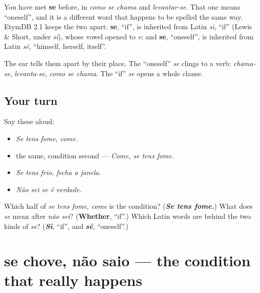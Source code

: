 \begin{cousinweb}
You have met \textbf{se} before, in \emph{como se chama} and \emph{levantar-se}. That one means \textquotedblleft{}oneself\textquotedblright{}, and it is a different word that happens to be spelled the same way. EtymDB 2.1 keeps the two apart: \textbf{se}, \textquotedblleft{}if\textquotedblright{}, is inherited from Latin \emph{sī}, \textquotedblleft{}if\textquotedblright{} (Lewis \& Short, under \emph{si}), whose vowel opened to \emph{e}; and \textbf{se}, \textquotedblleft{}oneself\textquotedblright{}, is inherited from Latin \emph{sē}, \textquotedblleft{}himself, herself, itself\textquotedblright{}.

The ear tells them apart by their place. The \textquotedblleft{}oneself\textquotedblright{} \emph{se} clings to a verb: \emph{chama-se}, \emph{levanta-se}, \emph{como se chama}. The \textquotedblleft{}if\textquotedblright{} \emph{se} opens a whole clause.
\end{cousinweb}

\subsection*{Your turn}
Say these aloud:

\begin{itemize}
\raggedright
  \item \emph{Se tens fome, come.}
  \item the same, condition second — \emph{Come, se tens fome.}
  \item \emph{Se tens frio, fecha a janela.}
  \item \emph{Não sei se é verdade.}
\end{itemize}

\begin{tcolorbox}[breakable,colback=teal!4,colframe=teal!35!black,title={Before you move on}]
Which half of \emph{se tens fome, come} is the condition? (\emph{\textbf{Se tens fome.}}) What does \emph{se} mean after \emph{não sei}? (\textbf{Whether}, \textquotedblleft{}if\textquotedblright{}.) Which Latin words are behind the two kinds of \emph{se}? (\emph{\textbf{Sī}}, \textquotedblleft{}if\textquotedblright{}, and \emph{\textbf{sē}}, \textquotedblleft{}oneself\textquotedblright{}.)
\end{tcolorbox}
\section[se chove, não saio]{se chove, não saio — the condition that really happens}


